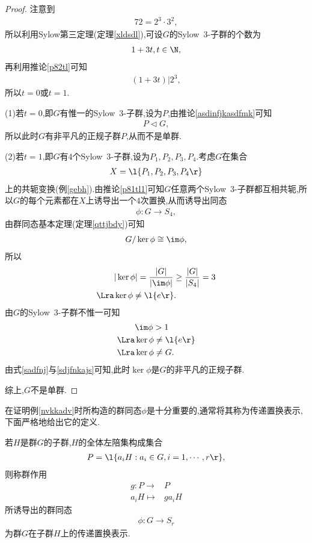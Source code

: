 \begin{proof}
    注意到\begin{align*}
        72=2^3\cdot3^2,
    \end{align*}所以利用Sylow第三定理(定理\ref{xldsdl}),可设$G$的Sylow\ $3$-子群的个数为\begin{align*}
        1+3t,t\in\N,
    \end{align*}再利用推论\ref{p82tl}可知\begin{align*}
        (1+3t)|2^3,
    \end{align*}所以$t=0$或$t=1$.

    (1)若$t=0$,即$G$有惟一的Sylow\ $3$-子群,设为$P$,由推论\ref{asdinfjkasdfmk}可知\begin{align*}
        P\lhd G,
    \end{align*}所以此时$G$有非平凡的正规子群$P$,从而不是单群.

    (2)若$t=1$,即$G$有$4$个Sylow\ $3$-子群,设为$P_1,P_2,P_3,P_4$.考虑$G$在集合\begin{align*}
        X=\l\{P_1,P_2,P_3,P_4\r\}
    \end{align*}上的共轭变换(例\ref{gebh}).由推论\ref{p81tl1}可知$G$任意两个Sylow\ $3$-子群都互相共轭,所以$G$的每个元素都在$X$上诱导出一个$4$次置换,从而诱导出同态\begin{align*}
        \phi:G\to S_4,
    \end{align*}由群同态基本定理(定理\ref{qttjbdy})可知\begin{align*}
        G/\ker\phi\cong\im\phi,
    \end{align*}所以\begin{align}
        &|\ker\phi|=\frac{|G|}{|\im\phi|}\geq\frac{|G|}{|S_4|}=3\nonumber\\
        \Lra&\ker\phi\neq\l\{e\r\}.\label{sadfnj}
    \end{align}由$G$的Sylow\ $3$-子群不惟一可知\begin{align}
        &\im\phi>1\nonumber\\
        \Lra&\ker\phi\neq\l\{e\r\}\nonumber\\
        \Lra&\ker\phi\neq G.\label{sdjfnkajs}
    \end{align}由式\eqref{sadfnj}与\eqref{sdjfnkajs}可知,此时$\ker\phi$是$G$的非平凡的正规子群.

    综上,$G$不是单群.
\end{proof}
\begin{remark}
    在证明例\ref{nvkkadv}时所构造的群同态$\phi$是十分重要的,通常将其称为传递置换表示,下面严格地给出它的定义.
\end{remark}
\begin{definition}[传递置换表示]\label{idvhbu}
    若$H$是群$G$的子群,$H$的全体左陪集构成集合\begin{align*}
        P=\l\{a_iH:a_i\in G,i=1,\cdots,r\r\},
    \end{align*}则称群作用\begin{align*}
        g:P\to&P\\
        a_iH\mapsto&ga_iH
    \end{align*}所诱导出的群同态\begin{align*}
        \phi:G\to S_r
    \end{align*}为群$G$在子群$H$上的传递置换表示.
\end{definition}
